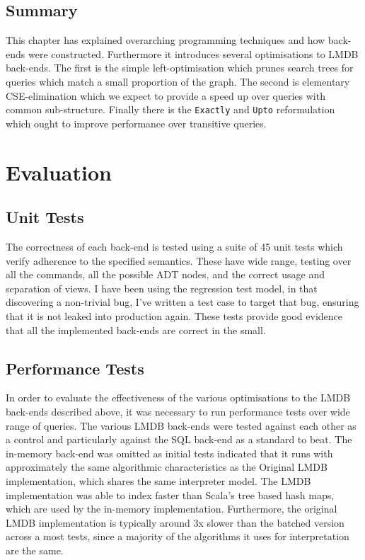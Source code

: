 \documentclass[12pt,a4paper,twoside,openright]{report}
\newcommand\codeName[1]{\texttt{#1}}
\begin{document}
\section{Summary}
This chapter has explained overarching programming techniques and how back-ends were constructed. Furthermore it introduces several optimisations to LMDB back-ends. The first is the simple left-optimisation which prunes search trees for queries which match a small proportion of the graph. The second is elementary CSE-elimination which we expect to provide a speed up over queries with common sub-structure. Finally there is the \codeName{Exactly} and \codeName{Upto} reformulation which ought to improve performance over transitive queries.

\chapter{Evaluation}
\section{Unit Tests}
The correctness of each back-end is tested using a suite of 45 unit tests which verify adherence to the specified semantics. These have  wide range, testing over all the commands, all the possible ADT nodes, and the correct usage and separation of views. I have been using the regression test model, in that discovering a non-trivial bug, I've written a test case to target that bug, ensuring that it is not leaked into production again. These tests provide good evidence that all the implemented back-ends are correct in the small.
\section{Performance Tests}
	In order to evaluate the effectiveness of the various optimisations to the LMDB back-ends described above, it was necessary to run performance tests over wide range of queries. The various LMDB back-ends were tested against each other as a control and particularly against the SQL back-end as a standard to beat. The in-memory back-end was omitted as initial tests indicated that it runs with approximately the same algorithmic characteristics as the Original LMDB implementation, which shares the same interpreter model. The LMDB implementation was able to index faster than Scala's tree based hash maps, which are used by the in-memory implementation. Furthermore, the original LMDB implementation is typically around 3x slower than the batched version across a most tests, since a majority of the algorithms it uses for interpretation are the same.
\end{document}
